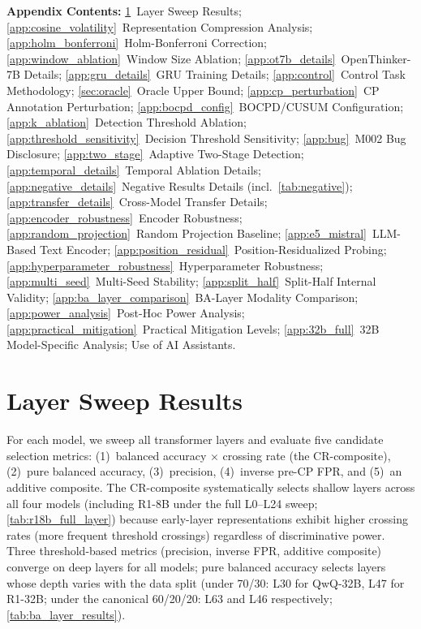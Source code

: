 \appendix

\noindent\textbf{Appendix Contents:}
\cref{app:layer_sweep}~Layer Sweep Results;
\cref{app:cosine_volatility}~Representation Compression Analysis;
\cref{app:holm_bonferroni}~Holm-Bonferroni Correction;
\cref{app:window_ablation}~Window Size Ablation;
\cref{app:ot7b_details}~OpenThinker-7B Details;
\cref{app:gru_details}~GRU Training Details;
\cref{app:control}~Control Task Methodology;
\cref{sec:oracle}~Oracle Upper Bound;
\cref{app:cp_perturbation}~CP Annotation Perturbation;
\cref{app:bocpd_config}~BOCPD/CUSUM Configuration;
\cref{app:k_ablation}~Detection Threshold Ablation;
\cref{app:threshold_sensitivity}~Decision Threshold Sensitivity;
\cref{app:bug}~M002 Bug Disclosure;
\cref{app:two_stage}~Adaptive Two-Stage Detection;
\cref{app:temporal_details}~Temporal Ablation Details;
\cref{app:negative_details}~Negative Results Details (incl.\ \cref{tab:negative});
\cref{app:transfer_details}~Cross-Model Transfer Details;
\cref{app:encoder_robustness}~Encoder Robustness;
\cref{app:random_projection}~Random Projection Baseline;
\cref{app:e5_mistral}~LLM-Based Text Encoder;
\cref{app:position_residual}~Position-Residualized Probing;
\cref{app:hyperparameter_robustness}~Hyperparameter Robustness;
\cref{app:multi_seed}~Multi-Seed Stability;
\cref{app:split_half}~Split-Half Internal Validity;
\cref{app:ba_layer_comparison}~BA-Layer Modality Comparison;
\cref{app:power_analysis}~Post-Hoc Power Analysis;
\cref{app:practical_mitigation}~Practical Mitigation Levels;
\cref{app:32b_full}~32B Model-Specific Analysis;
Use of AI Assistants.

\section{Layer Sweep Results}
\label{app:layer_sweep}

For each model, we sweep all transformer layers and evaluate five candidate selection metrics: (1)~balanced accuracy $\times$ crossing rate (the CR-composite), (2)~pure balanced accuracy, (3)~precision, (4)~inverse pre-CP FPR, and (5)~an additive composite. The CR-composite systematically selects shallow layers across all four models (including R1-8B under the full L0--L24 sweep; \cref{tab:r18b_full_layer}) because early-layer representations exhibit higher crossing rates (more frequent threshold crossings) regardless of discriminative power. Three threshold-based metrics (precision, inverse FPR, additive composite) converge on deep layers for all models; pure balanced accuracy selects layers whose depth varies with the data split (under 70/30: L30 for QwQ-32B, L47 for R1-32B; under the canonical 60/20/20: L63 and L46 respectively; \cref{tab:ba_layer_results}).

